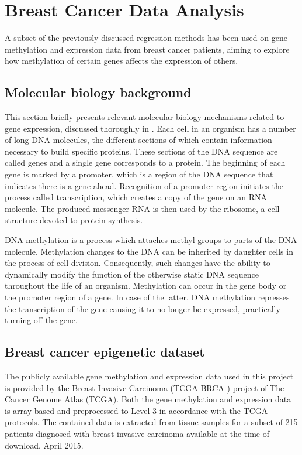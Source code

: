 \chapter{Breast Cancer Data Analysis}
A subset of the previously discussed regression methods has been used on gene methylation and expression data from breast cancer patients, aiming to explore how methylation of certain genes affects the expression of others.


\section{Molecular biology background} \label{sec:mol_bio}
This section briefly presents relevant molecular biology mechanisms related to gene expression, discussed thoroughly in \cite{setubal1997introduction}. Each cell in an organism has a number of long DNA molecules, the different sections of which contain information necessary to build specific proteins. These sections of the DNA sequence are called genes and a single gene corresponds to a protein. The beginning of each gene is marked by a promoter, which is a region of the DNA sequence that indicates there is a gene ahead. Recognition of a promoter region initiates the process called transcription, which creates a copy of the gene on an RNA molecule. The produced messenger RNA is then used by the ribosome, a cell structure devoted to protein synthesis.

DNA methylation is a process which attaches methyl groups to parts of the DNA molecule. Methylation changes to the DNA can be inherited by daughter cells in the process of cell division. Consequently, such changes have the ability to dynamically modify the function of the otherwise static DNA sequence throughout the life of an organism. Methylation can occur in the gene body or the promoter region of a gene. In case of the latter, DNA methylation represses the transcription of the gene causing it to no longer be expressed, practically turning off the gene. 


\section{Breast cancer epigenetic dataset} \label{sec:brca_data}
The publicly available gene methylation and expression data used in this project is provided by the Breast Invasive Carcinoma (TCGA-BRCA \cite{cancer2012comprehensive}) project of The Cancer Genome Atlas (TCGA). Both the gene methylation and expression data is array based and preprocessed to Level 3 in accordance with the TCGA protocols. The contained data is extracted from tissue samples for a subset of 215 patients diagnosed with breast invasive carcinoma available at the time of download, April 2015. 

